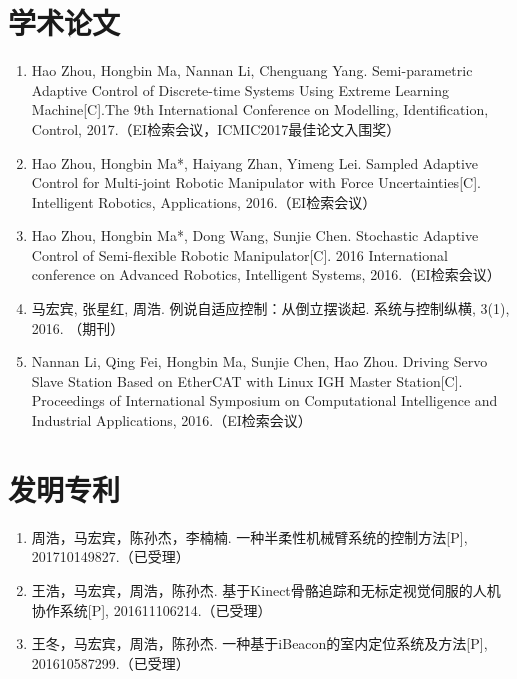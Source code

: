 
\begin{publications}{99}
\section*{学术论文}
\begin{enumerate}%
\item Hao Zhou, Hongbin Ma, Nannan Li, Chenguang Yang. Semi-parametric Adaptive Control of Discrete-time Systems Using Extreme Learning Machine[C].The 9th International Conference on Modelling, Identification, Control, 2017.（EI检索会议，ICMIC2017最佳论文入围奖）
\item Hao Zhou, Hongbin Ma*, Haiyang Zhan, Yimeng Lei. Sampled Adaptive Control for Multi-joint Robotic Manipulator with Force Uncertainties[C]. Intelligent Robotics, Applications, 2016.（EI检索会议）
\item Hao Zhou, Hongbin Ma*, Dong Wang, Sunjie Chen. Stochastic Adaptive Control of Semi-flexible Robotic Manipulator[C]. 2016 International conference on Advanced Robotics, Intelligent Systems, 2016.（EI检索会议）
\item 马宏宾, 张星红, 周浩. 例说自适应控制：从倒立摆谈起. 系统与控制纵横, 3(1), 2016. （期刊）
\item Nannan Li, Qing Fei, Hongbin Ma, Sunjie Chen, Hao Zhou. Driving Servo Slave Station Based on EtherCAT with Linux IGH Master Station[C]. Proceedings of International Symposium on Computational Intelligence and Industrial Applications, 2016.（EI检索会议）
\end{enumerate}

\section*{发明专利}
\begin{enumerate}%
\item 周浩，马宏宾，陈孙杰，李楠楠. 一种半柔性机械臂系统的控制方法[P], 201710149827.（已受理）
\item 王浩，马宏宾，周浩，陈孙杰. 基于Kinect骨骼追踪和无标定视觉伺服的人机协作系统[P], 201611106214.（已受理）
\item 王冬，马宏宾，周浩，陈孙杰. 一种基于iBeacon的室内定位系统及方法[P], 201610587299.（已受理）
\end{enumerate}


\end{publications}
